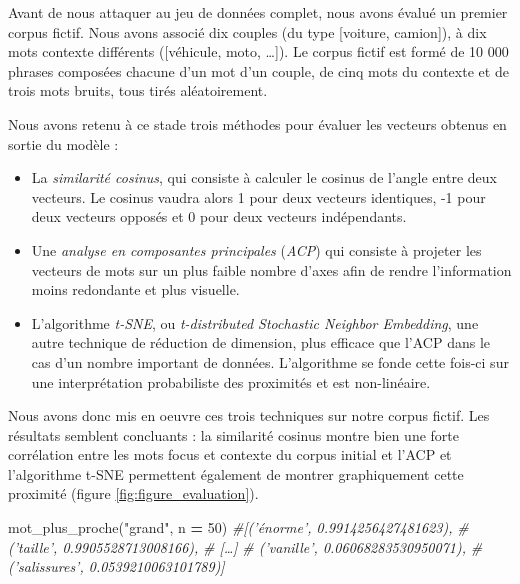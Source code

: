 \documentclass[11pt,french,french]{article}
\newenvironment{Shaded}{\begin{snugshade}}{\end{snugshade}}
\newcommand{\CommentTok}[1]{\textcolor[rgb]{0.56,0.35,0.01}{\textit{#1}}}
\newcommand{\DecValTok}[1]{\textcolor[rgb]{0.00,0.00,0.81}{#1}}
\newcommand{\NormalTok}[1]{#1}
\newcommand{\OperatorTok}[1]{\textcolor[rgb]{0.81,0.36,0.00}{\textbf{#1}}}
\newcommand{\StringTok}[1]{\textcolor[rgb]{0.31,0.60,0.02}{#1}}
\begin{document}
Avant de nous attaquer au jeu de données complet, nous avons évalué un
premier corpus fictif. Nous avons associé dix couples (du type
{[}voiture, camion{]}), à dix mots contexte différents ({[}véhicule,
moto, \dots{]}). Le corpus fictif est formé de 10 000 phrases composées
chacune d'un mot d'un couple, de cinq mots du contexte et de trois mots
bruits, tous tirés aléatoirement.

Nous avons retenu à ce stade trois méthodes pour évaluer les vecteurs
obtenus en sortie du modèle :

\begin{itemize}
\item
  La \emph{similarité cosinus}, qui consiste à calculer le cosinus de
  l'angle entre deux vecteurs. Le cosinus vaudra alors 1 pour deux
  vecteurs identiques, -1 pour deux vecteurs opposés et 0 pour deux
  vecteurs indépendants.
\item
  Une \emph{analyse en composantes principales} (\emph{ACP}) qui
  consiste à projeter les vecteurs de mots sur un plus faible nombre
  d'axes afin de rendre l'information moins redondante et plus visuelle.
\item
  L'algorithme \emph{t-SNE}, ou \emph{t-distributed Stochastic Neighbor
  Embedding}, une autre technique de réduction de dimension, plus
  efficace que l'ACP dans le cas d'un nombre important de données.
  L'algorithme se fonde cette fois-ci sur une interprétation
  probabiliste des proximités et est non-linéaire.
\end{itemize}

Nous avons donc mis en oeuvre ces trois techniques sur notre corpus
fictif. Les résultats semblent concluants : la similarité cosinus montre
bien une forte corrélation entre les mots focus et contexte du corpus
initial et l'ACP et l'algorithme t-SNE permettent également de montrer
graphiquement cette proximité (figure \ref{fig:figure_evaluation}).

\footnotesize

\begin{Shaded}
\begin{Highlighting}[]
\NormalTok{mot_plus_proche(}\StringTok{"grand"}\NormalTok{, n }\OperatorTok{=} \DecValTok{50}\NormalTok{)}
\CommentTok{#[('énorme', 0.9914256427481623),}
\CommentTok{# ('taille', 0.9905528713008166),}
\CommentTok{# […]}
\CommentTok{# ('vanille', 0.06068283530950071),}
\CommentTok{# ('salissures', 0.0539210063101789)]}
\end{Highlighting}
\end{Shaded}
\end{document}
